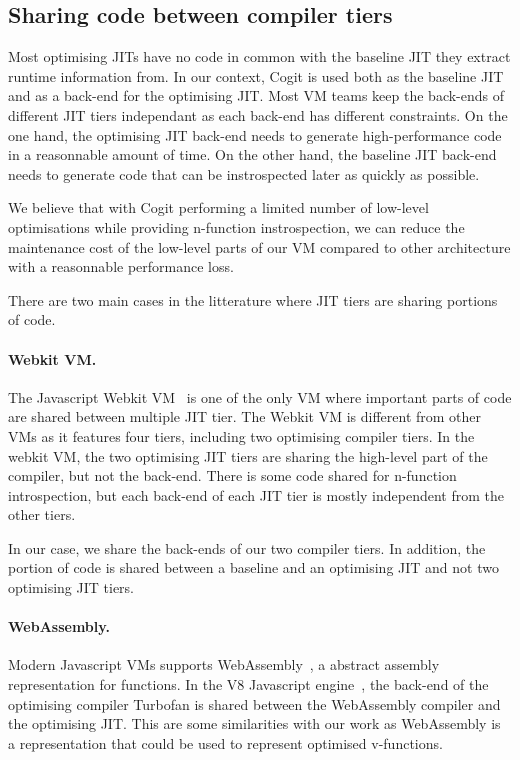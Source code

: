 \documentclass[a4paper,12pt,twoside]{../includes/ThesisStyle}
\begin{document}
\subsection{Sharing code between compiler tiers}
\label{sec:codeSharing}

Most optimising JITs have no code in common with the baseline JIT they extract runtime information from. In our context, Cogit is used both as the baseline JIT and as a back-end for the optimising JIT. Most VM teams keep the back-ends of different JIT tiers independant as each back-end has different constraints. On the one hand, the optimising JIT back-end needs to generate high-performance code in a reasonnable amount of time. On the other hand, the baseline JIT back-end needs to generate code that can be instrospected later as quickly as possible. 

We believe that with Cogit performing a limited number of low-level optimisations while providing n-function instrospection, we can reduce the maintenance cost of the low-level parts of our VM compared to other architecture with a reasonnable performance loss. 

There are two main cases in the litterature where JIT tiers are sharing portions of code.

\paragraph{Webkit VM.}The Javascript Webkit VM~\cite{Webkit15} is one of the only VM where important parts of code are shared between multiple JIT tier. The Webkit VM is different from other VMs as it features four tiers, including two optimising compiler tiers. In the webkit VM, the two optimising JIT tiers are sharing the high-level part of the compiler, but not the back-end. There is some code shared for n-function introspection, but each back-end of each JIT tier is mostly independent from the other tiers.

In our case, we share the back-ends of our two compiler tiers. In addition, the portion of code is shared between a baseline and an optimising JIT and not two optimising JIT tiers.

\paragraph{WebAssembly.}Modern Javascript VMs supports WebAssembly~\cite{WebAssembly}, a abstract assembly representation for functions. In the V8 Javascript engine~\cite{V8}, the back-end of the optimising compiler Turbofan is shared between the WebAssembly compiler and the optimising JIT. This are some similarities with our work as WebAssembly is a representation that could be used to represent optimised v-functions. 
\end{document}
